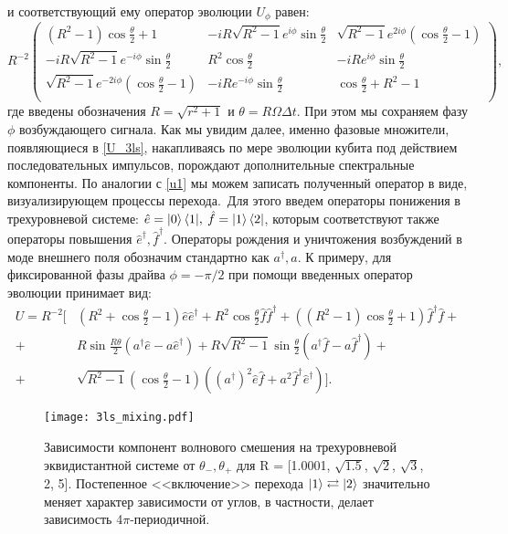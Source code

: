 и соответствующий ему оператор эволюции $U_\phi$ равен:
\begin{equation} 
 R^{-2}
 \left(
 \begin{array}{ccc}
 \left(R^2-1\right) \cos \frac{\theta }{2}+1 & -i R \sqrt{R^2-1} e^{i \phi } \sin \frac{\theta }{2} & \sqrt{R^2-1} e^{2 i \phi } \left(\cos
 \frac{\theta }{2}-1\right) \\
 -i R \sqrt{R^2-1} e^{-i \phi } \sin \frac{\theta }{2} & R^2 \cos \frac{\theta }{2} & -i R e^{i \phi } \sin \frac{\theta }{2}
 \\
 \sqrt{R^2-1} e^{-2 i \phi } \left(\cos \frac{\theta }{2}-1\right) & -i R e^{-i \phi } \sin \frac{\theta }{2} & \cos \frac{\theta
 }{2}+R^2-1 \\
 \end{array}
 \right),
 \label{U_3ls}
\end{equation}
где введены обозначения $R = \sqrt{r^2 + 1}$ и $\theta = R\Omega \Delta t$. При этом мы сохраняем фазу $\phi$  возбуждающего сигнала. Как мы увидим далее, именно фазовые множители, появляющиеся в \eqref{U_3ls}, накапливаясь по мере эволюции кубита под действием последовательных импульсов, порождают дополнительные спектральные компоненты.
По аналогии с \eqref{u1} мы можем записать полученный оператор в виде, визуализирующем процессы перехода.~Для этого введем операторы понижения в трехуровневой системе: $\hat{e} = \ket{0}\bra{1}\!,\:\hat{f} = \ket{1}\bra{2}$, которым соответствуют также операторы повышения $\hat{e}^\dag, \hat{f}^\dag$. Операторы рождения и уничтожения возбуждений в моде внешнего поля обозначим стандартно как $a^\dag, a$.
К примеру, для фиксированной фазы драйва $\phi = -\pi/2$ при помощи введенных оператор эволюции принимает вид:
\begin{equation}
	\begin{split}
	U = R^{-2}\Big[
	&\left(R^2+\cos \frac{\theta }{2}-1\right)\hat{e}\hat{e}^\dag + R^2 \cos \frac{\theta }{2} \hat{f}\hat{f}^\dag + \left(\left(R^2-1\right) \cos\frac{\theta }{2}+1\right) \hat{f}^\dag\hat{f} + \\
	+ &R \sin \frac{R \theta }{2} \left(a^\dag \hat{e}-a\hat{e}^\dag\right) + R \sqrt{R^2-1} \sin \frac{\theta }{2}\left(a^\dag \hat{f}-a\hat{f}^\dag\right) + \\
	+ &\sqrt{R^2-1} \left(\cos \frac{\theta }{2}-1\right)\left((a^\dagger)^2\hat{e}\hat{f} + a^2\hat{f}^\dag \hat{e}^\dag\right)
	\Big].
	\end{split}
\end{equation}
\begin{figure}[h]
	\centering
	\texttt{[image: 3ls\_mixing.pdf]}
	\caption[Квантовое волновое смешение на трехуровневой эквидистантной системе] {Зависимости компонент волнового смешения на трехуровневой эквидистантной системе от $\theta_-, \theta_+$ для R = [1.0001, $\sqrt{1.5}$, $\sqrt{2}$, $\sqrt{3}$, 2, 5]. Постепенное <<включение>> перехода $\ket{1}\rightleftarrows\ket{2}$ значительно меняет характер зависимости от углов, в частности, делает зависимость 4$\pi$-периодичной. }
	\label{fig:maps_3ls}
\end{figure}
